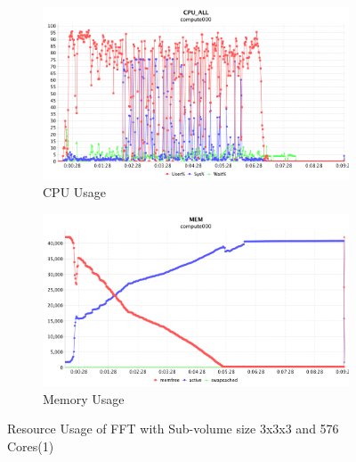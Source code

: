 \begin{figure}[!ht]
\centering
\begin{subfigure}{1\textwidth}
  \centering
  \includegraphics[width=1\linewidth]{figures/FFT131_576_CPU.png}
  \caption{CPU Usage}
  \label{FFT131_576_CPU}
\end{subfigure}
\begin{subfigure}{1\textwidth}
  \centering
  \includegraphics[width=1\linewidth]{figures/FFT131_576_MEM.png}
  \caption{Memory Usage}
  \label{FFT131_576_MEM}
\end{subfigure}
\caption{Resource Usage of FFT with Sub-volume size 3x3x3 and 576 Cores(1)}
\label{FFT131_576}
\end{figure}

